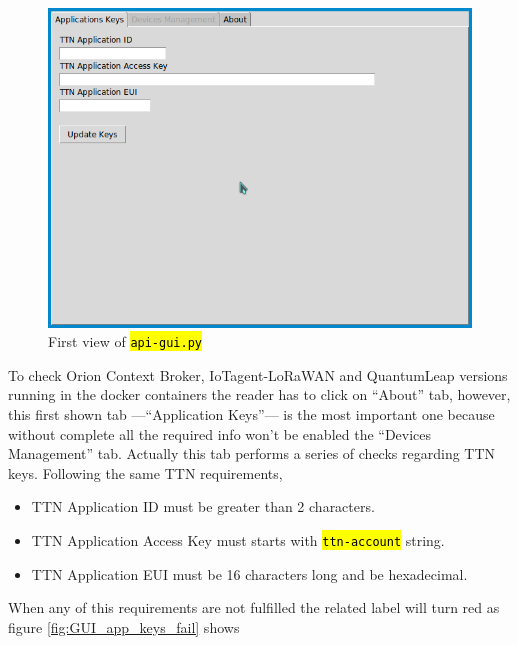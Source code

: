 \documentclass[11pt,a4paper,dvipsnames,twoside]{article}
\newcommand{\cmd}[1] {\hl{\texttt{#1}}}
\begin{document}
\begin{figure}[ht]
  \centering
  \includegraphics[width=.9\textwidth]{../pictures/GUI_app_keys.png}
  \caption{First view of \cmd{api-gui.py}}
  \label{fig:GUI_app_keys}
\end{figure}

To check Orion Context Broker, IoTagent-LoRaWAN and QuantumLeap versions running in the docker containers the reader has to click on \enquote{About} tab, however, this first shown tab ---\enquote{Application Keys}--- is the most important one because without complete all the required info won't be enabled the \enquote{Devices Management} tab. Actually this tab performs a series of checks regarding TTN keys. Following the same TTN requirements, 

\begin{itemize}
  \item TTN Application ID must be greater than 2 characters.
  \item TTN Application Access Key must starts with \cmd{ttn-account} string.
  \item TTN Application EUI must be 16 characters long and be hexadecimal. 
\end{itemize}
When any of this requirements are not fulfilled the related label will turn red as figure \ref{fig:GUI_app_keys_fail} shows
\end{document}
